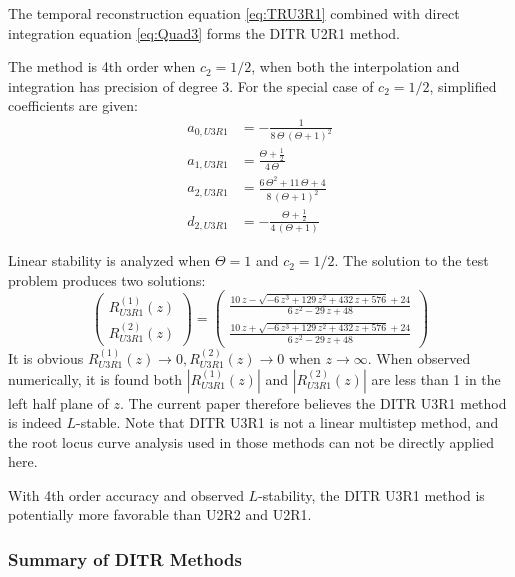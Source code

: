 \documentclass[preprint,12pt]{elsarticle}
\begin{document}
The temporal reconstruction equation \eqref{eq:TRU3R1}
combined with direct integration equation \eqref{eq:Quad3}
forms the DITR U2R1 method.

The method is 4th order when $c_2=1/2$, when
both the interpolation and integration has precision
of degree 3.
For the special case of $c_2=1/2$, simplified
coefficients are given:
\begin{equation}
    \begin{aligned}
        a_{0,U3R1} & = -\frac{1}{8\,\Theta\,{\left(\Theta+1\right)}^2}                \\
        a_{1,U3R1} & = \frac{\Theta+\frac{1}{2}}{4\,\Theta}                           \\
        a_{2,U3R1} & =  \frac{6\,\Theta^2+11\,\Theta+4}{8\,{\left(\Theta+1\right)}^2} \\
        d_{2,U3R1} & = -\frac{\Theta+\frac{1}{2}}{4\,\left(\Theta+1\right)}
    \end{aligned}
    \label{eq:interpU3R1-S}
\end{equation}

Linear stability is analyzed when $\Theta =1$ and $c_2 = 1/2$.
The solution to the test problem
produces two solutions:
\begin{equation}
    \left(
    \begin{matrix}
        R_{U3R1}^{(1)}(z) \\
        R_{U3R1}^{(2)}(z)
    \end{matrix}
    \right)=\left(\begin{array}{c} \frac{10\,z-\sqrt{-6\,z^3+129\,z^2+432\,z+576}+24}{6\,z^2-29\,z+48}\\ \frac{10\,z+\sqrt{-6\,z^3+129\,z^2+432\,z+576}+24}{6\,z^2-29\,z+48} \end{array}\right)
\end{equation}
It is obvious $R_{U3R1}^{(1)}(z)\rightarrow 0, R_{U3R1}^{(2)}(z)\rightarrow0$ when
$z\rightarrow\infty$.
When observed numerically, it is found both $|R_{U3R1}^{(1)}(z)|$
and $|R_{U3R1}^{(2)}(z)|$ are less than 1 in the left
half plane of $z$.
The current paper therefore believes %
the DITR U3R1 method is indeed $L$-stable.
Note that DITR U3R1 is not a linear multistep method,
and the root locus curve analysis used in those methods
can not be directly applied here.

With 4th order accuracy and observed $L$-stability, the
DITR U3R1 method is potentially more favorable than
U2R2 and U2R1.

\subsubsection{Summary of DITR Methods}
\end{document}
